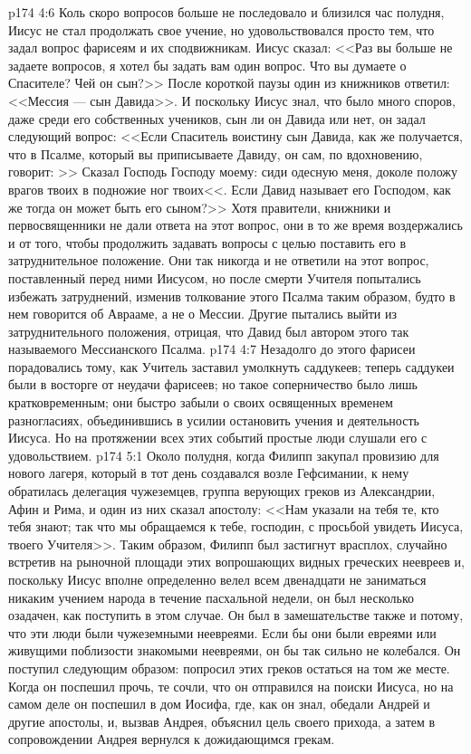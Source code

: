\vs p174 4:6 Коль скоро вопросов больше не последовало и близился час полудня, Иисус не стал продолжать свое учение, но удовольствовался просто тем, что задал вопрос фарисеям и их сподвижникам. Иисус сказал: <<Раз вы больше не задаете вопросов, я хотел бы задать вам один вопрос. Что вы думаете о Спасителе? Чей он сын?>> После короткой паузы один из книжников ответил: <<Мессия --- сын Давида>>. И поскольку Иисус знал, что было много споров, даже среди его собственных учеников, сын ли он Давида или нет, он задал следующий вопрос: <<Если Спаситель воистину сын Давида, как же получается, что в Псалме, который вы приписываете Давиду, он сам, по вдохновению, говорит: >> Сказал Господь Господу моему: сиди одесную меня, доколе положу врагов твоих в подножие ног твоих<<. Если Давид называет его Господом, как же тогда он может быть его сыном?>> Хотя правители, книжники и первосвященники не дали ответа на этот вопрос, они в то же время воздержались и от того, чтобы продолжить задавать вопросы с целью поставить его в затруднительное положение. Они так никогда и не ответили на этот вопрос, поставленный перед ними Иисусом, но после смерти Учителя попытались избежать затруднений, изменив толкование этого Псалма таким образом, будто в нем говорится об Аврааме, а не о Мессии. Другие пытались выйти из затруднительного положения, отрицая, что Давид был автором этого так называемого Мессианского Псалма.
\vs p174 4:7 Незадолго до этого фарисеи порадовались тому, как Учитель заставил умолкнуть саддукеев; теперь саддукеи были в восторге от неудачи фарисеев; но такое соперничество было лишь кратковременным; они быстро забыли о своих освященных временем разногласиях, объединившись в усилии остановить учения и деятельность Иисуса. Но на протяжении всех этих событий простые люди слушали его с удовольствием.
\vs p174 5:1 Около полудня, когда Филипп закупал провизию для нового лагеря, который в тот день создавался возле Гефсимании, к нему обратилась делегация чужеземцев, группа верующих греков из Александрии, Афин и Рима, и один из них сказал апостолу: <<Нам указали на тебя те, кто тебя знают; так что мы обращаемся к тебе, господин, с просьбой увидеть Иисуса, твоего Учителя>>. Таким образом, Филипп был застигнут врасплох, случайно встретив на рыночной площади этих вопрошающих видных греческих неевреев и, поскольку Иисус вполне определенно велел всем двенадцати не заниматься никаким учением народа в течение пасхальной недели, он был несколько озадачен, как поступить в этом случае. Он был в замешательстве также и потому, что эти люди были чужеземными неевреями. Если бы они были евреями или живущими поблизости знакомыми неевреями, он бы так сильно не колебался. Он поступил следующим образом: попросил этих греков остаться на том же месте. Когда он поспешил прочь, те сочли, что он отправился на поиски Иисуса, но на самом деле он поспешил в дом Иосифа, где, как он знал, обедали Андрей и другие апостолы, и, вызвав Андрея, объяснил цель своего прихода, а затем в сопровождении Андрея вернулся к дожидающимся грекам.
